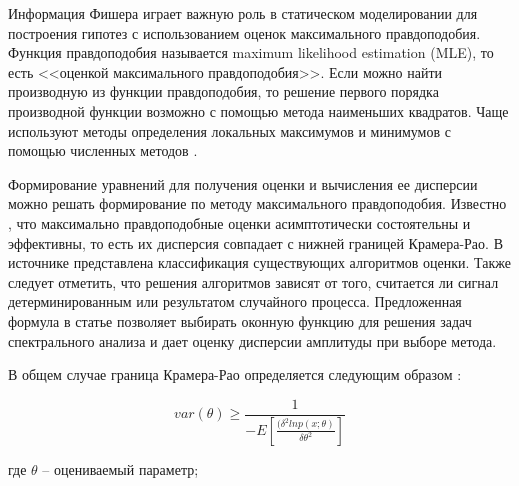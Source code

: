 Информация Фишера играет важную роль в статическом моделировании для построения гипотез с использованием оценок максимального правдоподобия. Функция правдоподобия называется maximum likelihood estimation (MLE), то есть <<оценкой максимального правдоподобия>>. Если можно найти производную из функции правдоподобия, то решение первого порядка производной функции возможно с помощью метода наименьших квадратов. Чаще используют методы определения локальных максимумов и минимумов с помощью численных методов \cite{press1992art}.


Формирование уравнений для получения оценки и вычисления ее дисперсии можно решать формирование по методу максимального правдоподобия. Известно \cite{kay1993fundamentals}, что максимально правдоподобные оценки асимптотически состоятельны и эффективны, то есть их дисперсия совпадает с нижней границей Крамера-Рао. В источнике \cite{kay2013fundamentals} представлена классификация существующих алгоритмов оценки. Также следует отметить, что решения алгоритмов зависят от того, считается ли сигнал детерминированным или результатом случайного процесса. Предложенная формула в статье позволяет выбирать оконную функцию для решения задач спектрального анализа и дает оценку дисперсии амплитуды при выборе метода.

В общем случае граница Крамера-Рао определяется следующим образом \cite{kay1993fundamentals, kay2013fundamentals}:

\begin{equation}
	\label{eq:equation1}
	var(\theta)\geq\frac{1}{-E\left[\frac{(\delta^2 ln p(x;\theta)}{\delta\theta^2}\right]}
\end{equation}

где $\theta$ -- оцениваемый параметр; 

